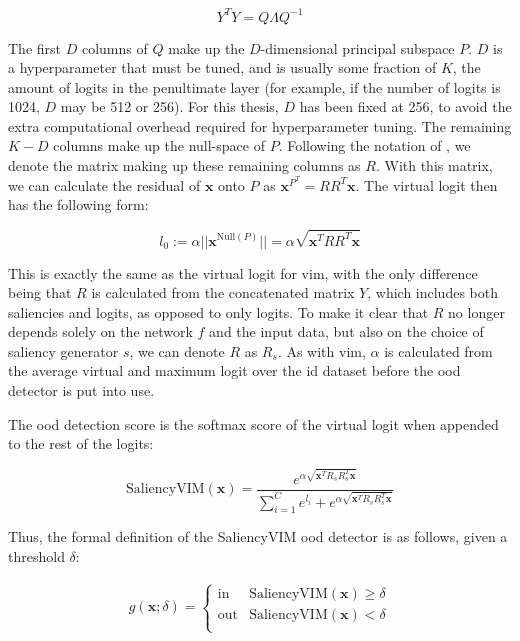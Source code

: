 \documentclass[UKenglish]{uiomasterthesis} %
\theoremstyle{definition}
\begin{document}
\begin{equation}
    Y^TY = Q\Lambda Q^{-1}
\end{equation}

The first $D$ columns of $Q$ make up the $D$-dimensional principal subspace $P$. $D$ is a hyperparameter that must be tuned, and is usually some fraction of $K$, the amount of logits in the penultimate layer (for example, if the number of logits is 1024, $D$ may be 512 or 256). For this thesis, $D$ has been fixed at 256, to avoid the extra computational overhead required for hyperparameter tuning. The remaining $K - D$ columns make up the null-space of $P$. Following the notation of \cite{vim}, we denote the matrix making up these remaining columns as $R$. With this matrix, we can calculate the residual of $\bm{x}$ onto $P$ as $\bm{x}^{P^T} = RR^T\bm{x}$. The virtual logit then has the following form:

\begin{equation}
l_0 := \alpha || \bm{x}^{\text{Null}(P)}|| = \alpha \sqrt{\bm{x}^T RR^T\bm{x}}
\end{equation}

This is exactly the same as the virtual logit for \ac{vim}, with the only difference being that $R$ is calculated from the concatenated matrix $Y$, which includes both saliencies and logits, as opposed to only logits. To make it clear that $R$ no longer depends solely on the network $f$ and the input data, but also on the choice of saliency generator $s$, we can denote $R$ as $R_s$. As with \ac{vim}, $\alpha$ is calculated from the average virtual and maximum logit over the \ac{id} dataset before the \ac{ood} detector is put into use.

The \ac{ood} detection score is the softmax score of the virtual logit when appended to the rest of the logits:

\begin{equation}
\text{SaliencyVIM}(\bm{x}) = \frac{e^{\alpha\sqrt{\bm{x}^TR_sR_s^T\bm{x}}}}{\sum_{i=1}^C e^{l_i} + e^{\alpha\sqrt{\bm{x}^TR_sR_s^T\bm{x}}}}
\end{equation}

Thus, the formal definition of the SaliencyVIM \ac{ood} detector is as follows, given a threshold $\delta$:

\begin{align}
    g(\bm{x}; \delta)=\begin{cases} 
        \text{in } & \text{SaliencyVIM}(\bm{x}) \ge \delta \\[10pt]
        \text{out} & \text{SaliencyVIM}(\bm{x}) < \delta \\[10pt]
   \end{cases}
\label{eq:aggregate}
\end{align}
\end{document}
